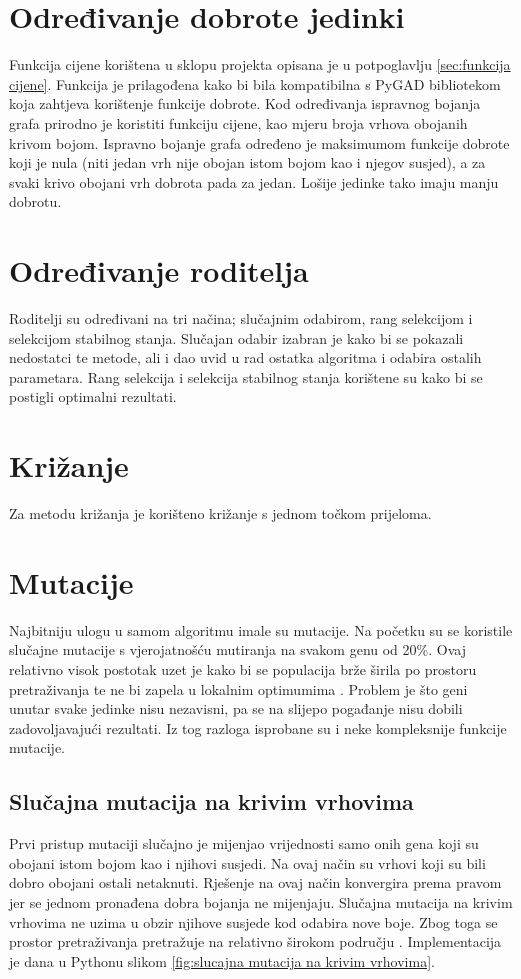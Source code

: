 \documentclass[times, utf8, zavrsni, numeric]{fer}
\begin{document}
\section{Određivanje dobrote jedinki}
Funkcija cijene korištena u sklopu projekta opisana je u potpoglavlju \ref{sec:funkcija cijene}. Funkcija je prilagođena kako bi bila kompatibilna s PyGAD bibliotekom koja zahtjeva korištenje funkcije dobrote. Kod određivanja ispravnog bojanja grafa prirodno je koristiti funkciju cijene, kao mjeru broja vrhova obojanih krivom bojom. Ispravno bojanje grafa određeno je maksimumom funkcije dobrote koji je nula (niti jedan vrh nije obojan istom bojom kao i njegov susjed), a za svaki krivo obojani vrh dobrota pada za jedan. Lošije jedinke tako imaju manju dobrotu.

\section{Određivanje roditelja}
Roditelji su određivani na tri načina; slučajnim odabirom, rang selekcijom i selekcijom stabilnog stanja. Slučajan odabir izabran je kako bi se pokazali nedostatci te metode, ali i dao uvid u rad ostatka algoritma i odabira ostalih parametara. Rang selekcija i selekcija stabilnog stanja korištene su kako bi se postigli optimalni rezultati.

\section{Križanje}
Za metodu križanja je korišteno križanje s jednom točkom prijeloma.

\section{Mutacije}
Najbitniju ulogu u samom algoritmu imale su mutacije. Na početku su se koristile slučajne mutacije s vjerojatnošću mutiranja na svakom genu od 20\%. Ovaj relativno visok postotak uzet je kako bi se populacija brže širila po prostoru pretraživanja te ne bi zapela u lokalnim optimumima \cite{geeksforgeeks}. Problem je što geni unutar svake jedinke nisu nezavisni, pa se na slijepo pogađanje nisu dobili zadovoljavajući rezultati. Iz tog razloga isprobane su i neke kompleksnije funkcije mutacije. 

\subsection{Slučajna mutacija na krivim vrhovima}
\label{sec: slucajna mutacija na krivim vrhovima}
Prvi pristup mutaciji slučajno je mijenjao vrijednosti samo onih gena koji su obojani istom bojom kao i njihovi susjedi. Na ovaj način su vrhovi koji su bili dobro obojani ostali netaknuti. Rješenje na ovaj način konvergira prema pravom jer se jednom pronađena dobra bojanja ne mijenjaju. Slučajna mutacija na krivim vrhovima ne uzima u obzir njihove susjede kod odabira nove boje. Zbog toga se prostor pretraživanja pretražuje na relativno širokom području \cite{hindi2012genetic}. Implementacija je dana u Pythonu slikom \ref{fig:slucajna mutacija na krivim vrhovima}.
\end{document}
